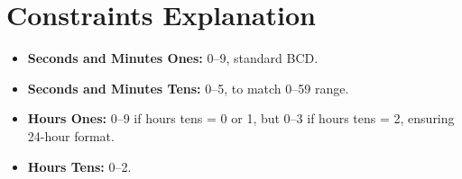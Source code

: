 \section{Constraints Explanation}
\begin{itemize}
    \item \textbf{Seconds and Minutes Ones:} 0–9, standard BCD.
    \item \textbf{Seconds and Minutes Tens:} 0–5, to match 0–59 range.
    \item \textbf{Hours Ones:} 0–9 if hours tens = 0 or 1, but 0–3 if hours tens = 2, ensuring 24-hour format.
    \item \textbf{Hours Tens:} 0–2.
\end{itemize}

